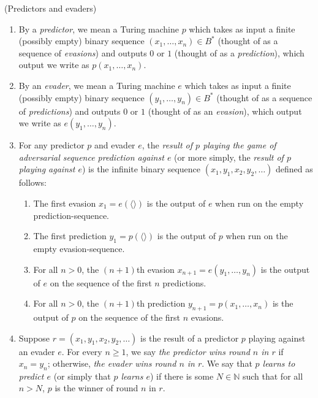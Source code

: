 \documentclass[twoside,11pt]{article}
\begin{document}
\begin{definition}
\label{evaderpredictordefn}
    (Predictors and evaders)
    \begin{enumerate}
        \item
        By a \emph{predictor}, we mean a Turing machine $p$
        which takes as input a finite (possibly empty) binary sequence
        $(x_1,\ldots,x_n)\in B^*$
        (thought of as a sequence of \emph{evasions})
        and outputs $0$ or $1$ (thought of as a \emph{prediction}), which output
        we write as $p(x_1,\ldots,x_n)$.
        \item
        By an \emph{evader}, we mean a Turing machine $e$
        which takes as input a finite (possibly empty) binary sequence
        $(y_1,\ldots,y_n)\in B^*$
        (thought of as a sequence of \emph{predictions})
        and outputs $0$ or $1$ (thought of as an \emph{evasion}), which output
        we write as $e(y_1,\ldots,y_n)$.
        \item
        For any predictor $p$ and evader $e$, the \emph{result of $p$ playing the
        game of adversarial sequence
        prediction against $e$} (or more simply, the \emph{result of
        $p$ playing against $e$}) is the infinite binary sequence
        $(x_1,y_1,x_2,y_2,\ldots)$
        defined as follows:
        \begin{enumerate}
            \item
            The first evasion
            $x_1=e(\langle\rangle)$ is
            the output of $e$ when run on the empty prediction-sequence.
            \item
            The first prediction
            $y_1=p(\langle\rangle)$ is
            the output of $p$ when run on the empty evasion-sequence.
            \item
            For all $n>0$, the $(n+1)$th evasion
            $x_{n+1}=e(y_1,\ldots,y_n)$ is
            the output of $e$ on the sequence of the first $n$ predictions.
            \item
            For all $n>0$, the $(n+1)$th prediction
            $y_{n+1}=p(x_1,\ldots,x_n)$ is
            the output of $p$ on the sequence of the first $n$ evasions.
        \end{enumerate}
        \item
        Suppose $r=(x_1,y_1,x_2,y_2,\ldots)$ is the result of a predictor $p$ playing
        against an evader $e$. For every $n\geq 1$,
        we say \emph{the predictor wins round $n$ in $r$}
        if $x_n=y_n$; otherwise,
        \emph{the evader wins round $n$ in $r$}.
        We say that \emph{$p$ learns to predict $e$}
        (or simply that \emph{$p$ learns $e$}) if there is some $N\in\mathbb N$
        such that for all $n>N$, $p$ is the winner of round $n$ in $r$.
    \end{enumerate}
\end{definition}
\end{document}
